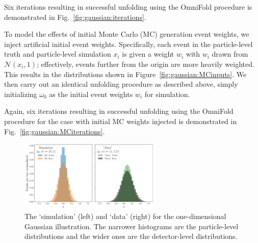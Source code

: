 Six iterations resulting in successful unfolding using the OmniFold procedure is demonstrated in Fig.~\ref{fig:gaussian:iterations}.

To model the effects of initial Monte Carlo (MC) generation event weights, we inject artificial initial event weights. Specifically, each event in the particle-level truth and particle-level simulation $x_i$ is given a weight $w_i$ with $w_i$ drawn from $\mathcal{N}(x_i, 1)$; effectively, events further from the origin are more heavily weighted. This results in the distributions shown in Figure~\ref{fig:gaussian:MCinputs}. We then carry out an identical unfolding procedure as described above, simply initializing $\omega_0$ as the initial event weights $w_i$ for simulation.

Again, six iterations resulting in successful unfolding using the OmniFold procedure for the case with initial MC weights injected is demonstrated in Fig.~\ref{fig:gaussian:MCiterations}.

\begin{figure}[h!]
\centering
\includegraphics[width=0.6\textwidth]{Figures/GaussianToyExample/GaussianToyExample-Distributions.pdf}
\caption{The `simulation' (left) and `data' (right) for the one-dimensional Gaussian illustration.  The narrower histograms are the particle-level distributions and the wider ones are the detector-level distributions.}
\label{fig:gaussian:inputs}
\end{figure}

